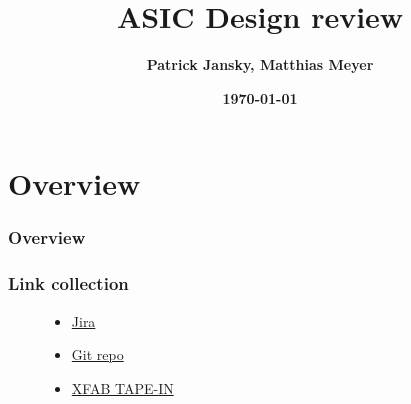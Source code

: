 \documentclass[xcolor=dvipsnames,envcountsect]{beamer}
\title[ASIC Design review]{ASIC Design review}
\author [Patrick Jansky, Matthias Meyer]{\textbf{Patrick Jansky, Matthias Meyer}}
\institute[OST] {{OST}\\[1em]
		\texttt{[image: ../../ASIC-DESIGN/data/03\_Plots/02\_Bootstrap/07\_boostrap\_montecarlo.pdf]}}
\date[\today]{\footnotesize \textbf{\today}}
\begin{document}
\begin{frame}{\titlepage}\end{frame}

\section{Overview}
\begin{frame}
\frametitle{Overview} %
\tableofcontents %
\end{frame}









\begin{frame}
	\frametitle{Link collection}
	\begin{figure}
		\centering
		\begin{minipage}{.4\textwidth}
			\centering
			\begin{itemize}
				\item \href{https://asic-project.atlassian.net/jira/software/projects/MAP/boards/3/roadmap}{Jira}
				\item \href{https://github.com/gstei/ASIC-DESIGN.git}{Git repo}
				\item \href{https://www.xfab.com/manufacturing/prototyping}{XFAB TAPE-IN}
			\end{itemize}
		\end{minipage}%
		\hfill
		\begin{minipage}{.59\textwidth}
			
		\end{minipage}
	\end{figure}
\end{frame}
\end{document}
